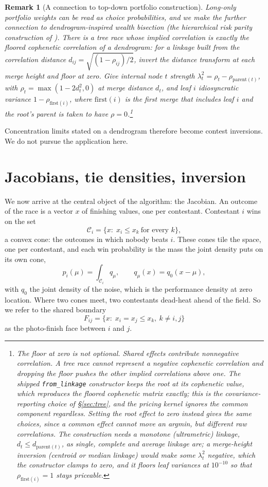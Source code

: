 \documentclass[11pt]{article}
\newtheorem{remark}{Remark}
\begin{document}
\begin{remark}[A connection to top-down portfolio construction]\label{rem:hrp}
Long-only portfolio weights can be read as choice probabilities, and we make the further connection to dendrogram-inspired wealth bisection (the hierarchical risk parity construction of \citet{lopezdeprado2016}).
There is a tree race whose implied correlation is exactly the
\emph{floored} cophenetic correlation of a dendrogram: for a linkage
built from the correlation distance $d_{ij}=\sqrt{(1-\rho_{ij})/2}$,
invert the distance transform at each merge height and floor at zero. Give internal node $t$ strength
$\lambda_t^2=\rho_t-\rho_{\mathrm{parent}(t)}$, with
$\rho_t=\max(1-2d_t^2,0)$ at merge distance $d_t$, and leaf $i$
idiosyncratic variance $1-\rho_{\mathrm{first}(i)}$, where
$\mathrm{first}(i)$ is the first merge that includes leaf $i$ and the
root's parent is taken to have $\rho=0$.\footnote{The floor at zero is not optional. Shared effects contribute nonnegative
correlation. A tree race cannot represent a negative cophenetic
correlation and dropping the floor pushes the other implied correlations
above one. The shipped \texttt{from\_linkage} constructor keeps the root at its
cophenetic value, which reproduces the floored cophenetic matrix exactly;
this is the covariance-reporting choice of \S\ref{sec:tree}, and the
pricing kernel ignores the common component regardless. Setting the root
effect to zero instead gives the same choices, since a common effect
cannot move an argmin, but different raw correlations. The construction
needs a monotone (ultrametric) linkage, $d_t\le d_{\mathrm{parent}(t)}$,
as single, complete and average linkage are; a merge-height inversion
(centroid or median linkage) would make some $\lambda_t^2$ negative, which
the constructor clamps to zero, and it floors leaf variances at
$10^{-10}$ so that $\rho_{\mathrm{first}(i)}=1$ stays priceable.}
\end{remark}

Concentration limits stated on a dendrogram therefore become contest
inversions. We do not pursue the application here.

\section{Jacobians, tie densities, inversion}\label{sec:jac}

We now arrive at the central object of the algorithm: the Jacobian. An outcome of the race is a vector $x$ of finishing values, one per
contestant. Contestant $i$ wins on the set
\[
  \mathcal{C}_i=\{x:\;x_i\le x_k\ \text{for every }k\},
\]
a convex cone: the outcomes in which nobody beats $i$. These cones tile
the space, one per contestant, and each win probability is the mass the
joint density puts on its own cone,
\[
  p_i(\mu)=\int_{\mathcal{C}_i}q_\mu,\qquad q_\mu(x)=q_0(x-\mu),
\]
with $q_0$ the joint density of the noise, which is the performance
density at zero location.
Where two cones meet, two contestants dead-heat ahead of the field. So we refer to the
shared boundary
\[
  F_{ij}=\{x:\;x_i=x_j\le x_k,\ k\ne i,j\}
\]
as the photo-finish face between $i$ and $j$.
\end{document}
